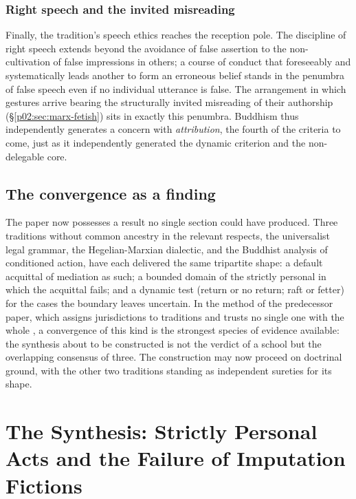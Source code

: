 \documentclass[11pt,a4paper]{article}
\begin{document}
\subsubsection{Right speech and the invited misreading}
\label{p02:sec:buddhism-speech}

Finally, the tradition's speech ethics reaches the reception pole. The discipline of right speech extends beyond the avoidance of false assertion to the non-cultivation of false impressions in others; a course of conduct that foreseeably and systematically leads another to form an erroneous belief stands in the penumbra of false speech even if no individual utterance is false. The arrangement in which gestures arrive bearing the structurally invited misreading of their authorship (\S\ref{p02:sec:marx-fetish}) sits in exactly this penumbra. Buddhism thus independently generates a concern with \emph{attribution}, the fourth of the criteria to come, just as it independently generated the dynamic criterion and the non-delegable core.

\subsection{The convergence as a finding}
\label{p02:sec:buddhism-convergence}

The paper now possesses a result no single section could have produced. Three traditions without common ancestry in the relevant respects, the universalist legal grammar, the Hegelian-Marxian dialectic, and the Buddhist analysis of conditioned action, have each delivered the same tripartite shape: a default acquittal of mediation as such; a bounded domain of the strictly personal in which the acquittal fails; and a dynamic test (return or no return; raft or fetter) for the cases the boundary leaves uncertain. In the method of the predecessor paper, which assigns jurisdictions to traditions and trusts no single one with the whole \parencite{huang2025toward}, a convergence of this kind is the strongest species of evidence available: the synthesis about to be constructed is not the verdict of a school but the overlapping consensus of three. The construction may now proceed on doctrinal ground, with the other two traditions standing as independent sureties for its shape.
\section{The Synthesis: Strictly Personal Acts and the Failure of Imputation Fictions}
\label{p02:sec:synthesis}
\end{document}
